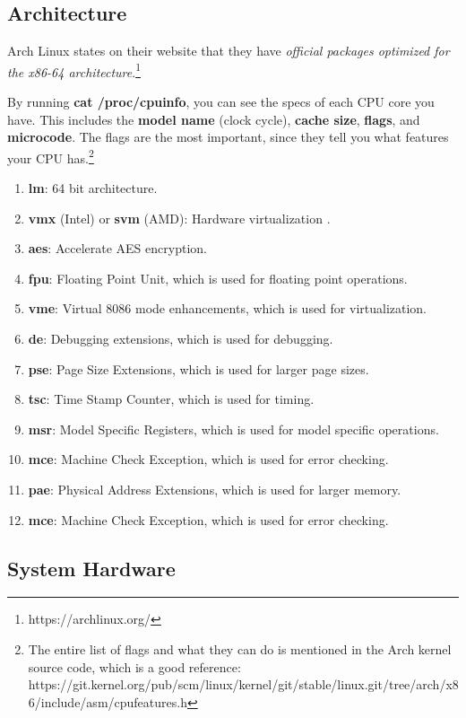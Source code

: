 \subsection{Architecture}

  Arch Linux states on their website that they have \textit{official packages optimized for the x86-64 architecture}.\footnote{https://archlinux.org/} 

  By running \textbf{cat /proc/cpuinfo}, you can see the specs of each CPU core you have. This includes the \textbf{model name} (clock cycle), \textbf{cache size}, \textbf{flags}, and \textbf{microcode}. The flags are the most important, since they tell you what features your CPU has.\footnote{The entire list of flags and what they can do is mentioned in the Arch kernel source code, which is a good reference: https://git.kernel.org/pub/scm/linux/kernel/git/stable/linux.git/tree/arch/x86/include/asm/cpufeatures.h} 
  \begin{enumerate} 
    \item \textbf{lm}: 64 bit architecture. 
    \item \textbf{vmx} (Intel) or \textbf{svm} (AMD): Hardware virtualization . 
    \item \textbf{aes}: Accelerate AES encryption. 
    \item \textbf{fpu}: Floating Point Unit, which is used for floating point operations. 
    \item \textbf{vme}: Virtual 8086 mode enhancements, which is used for virtualization. 
    \item \textbf{de}: Debugging extensions, which is used for debugging. 
    \item \textbf{pse}: Page Size Extensions, which is used for larger page sizes. 
    \item \textbf{tsc}: Time Stamp Counter, which is used for timing. 
    \item \textbf{msr}: Model Specific Registers, which is used for model specific operations. 
    \item \textbf{mce}: Machine Check Exception, which is used for error checking. 
    \item \textbf{pae}: Physical Address Extensions, which is used for larger memory. 
    \item \textbf{mce}: Machine Check Exception, which is used for error checking. 

  \end{enumerate}

  \subsection{System Hardware}


